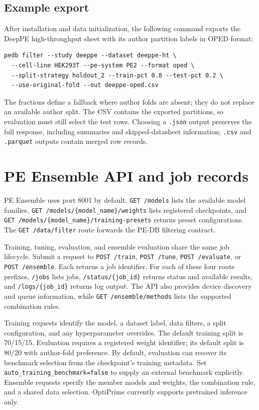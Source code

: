 \documentclass{article}
\begin{document}
\subsection{Example export}

After installation and data initialization, the following command exports the DeepPE high-throughput sheet with its author partition labels in OPED format:

\begin{verbatim}
pedb filter --study deeppe --dataset deeppe-ht \
  --cell-line HEK293T --pe-system PE2 --format oped \
  --split-strategy holdout_2 --train-pct 0.8 --test-pct 0.2 \
  --use-original-fold --out deeppe-oped.csv
\end{verbatim}

The fractions define a fallback where author folds are absent; they do not replace an available author split. The CSV contains the exported partitions, so evaluation must still select the test rows. Choosing a \nolinkurl{.json} output preserves the full response, including summaries and skipped-datasheet information; \nolinkurl{.csv} and \nolinkurl{.parquet} outputs contain merged row records.

\section{PE Ensemble API and job records}
\label{app:ensemble-api}

PE Ensemble uses port 8001 by default. \nolinkurl{GET /models} lists the available model families, \nolinkurl{GET /models/\{model_name\}/weights} lists registered checkpoints, and \nolinkurl{GET /models/\{model_name\}/training-presets} returns preset configurations. The \nolinkurl{GET /data/filter} route forwards the PE-DB filtering contract.

Training, tuning, evaluation, and ensemble evaluation share the same job lifecycle. Submit a request to \nolinkurl{POST /train}, \nolinkurl{POST /tune}, \nolinkurl{POST /evaluate}, or \nolinkurl{POST /ensemble}. Each returns a job identifier. For each of these four route prefixes, \nolinkurl{/jobs} lists jobs, \nolinkurl{/status/\{job_id\}} returns status and available results, and \nolinkurl{/logs/\{job_id\}} returns log output. The API also provides device discovery and queue information, while \nolinkurl{GET /ensemble/methods} lists the supported combination rules.

Training requests identify the model, a dataset label, data filters, a split configuration, and any hyperparameter overrides. The default training split is 70/15/15. Evaluation requires a registered weight identifier; its default split is 80/20 with author-fold preference. By default, evaluation can recover its benchmark selection from the checkpoint's training metadata. Set \nolinkurl{auto_training_benchmark=false} to supply an external benchmark explicitly. Ensemble requests specify the member models and weights, the combination rule, and a shared data selection. OptiPrime currently supports pretrained inference only.
\end{document}
